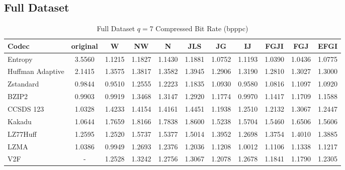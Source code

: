 \documentclass{article}
\begin{document}
\subsection{Full Dataset}
\begin{table}[h!]
\centering
\caption{Full Dataset $q=7$ Compressed Bit Rate (bpppc)}
\begin{tabular}{|l|cccccccccc|}
\hline
Codec &  original &      W &     NW &      N &    JLS &     JG &     IJ &   FGJI &    FGJ &   EFGI \\
\hline
Entropy & 3.5560 & 1.1215 & 1.1827 & 1.1430 & 1.1881 & 1.0752 & 1.1193 & 1.0390 & 1.0436 & 1.0775 \\
\hline
Huffman Adaptive &    2.1415 & 1.3575 & 1.3817 & 1.3582 & 1.3945 & 1.2906 & 1.3190 & 1.2810 & 1.3027 & 1.3000 \\
Zstandard        &    0.9844 & 0.9510 & 1.2555 & 1.2223 & 1.1835 & 1.0930 & 0.9580 & 1.0816 & 1.1097 & 1.0920 \\
BZIP2            &    0.9903 & 0.9919 & 1.3468 & 1.3147 & 1.2920 & 1.1774 & 0.9970 & 1.1417 & 1.1709 & 1.1588 \\
CCSDS 123        &    1.0328 & 1.4233 & 1.4154 & 1.4161 & 1.4451 & 1.1938 & 1.2510 & 1.2132 & 1.3067 & 1.2447 \\
Kakadu           &    1.0644 & 1.7659 & 1.8166 & 1.7838 & 1.8600 & 1.5238 & 1.5704 & 1.5460 & 1.6506 & 1.5606 \\
LZ77Huff         &    1.2595 & 1.2520 & 1.5737 & 1.5377 & 1.5014 & 1.3952 & 1.2698 & 1.3754 & 1.4010 & 1.3885 \\
LZMA             &    1.0386 & 0.9949 & 1.2693 & 1.2376 & 1.2036 & 1.1208 & 1.0012 & 1.1106 & 1.1338 & 1.1217 \\
V2F              &   - & 1.2528 & 1.3242 & 1.2756 & 1.3067 & 1.2078 & 1.2678 & 1.1841 & 1.1790 & 1.2305 \\
\hline
\end{tabular}
\end{table}
\end{document}
